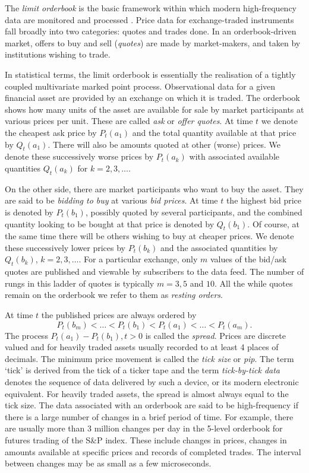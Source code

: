 The {\it limit orderbook} is the basic framework within which modern high-frequency data are monitored and processed \citep{harris2002trading,dacorogna2001introduction,hasbrouck2007empirical}.  Price data for exchange-traded instruments fall broadly 
into two categories:  quotes and trades done. In an orderbook-driven market, offers to buy and sell (\emph{quotes}) are made by market-makers, and taken by institutions wishing to trade.

In statistical terms, the limit orderbook is essentially the realisation of a tightly coupled multivariate marked point process. Observational data for a given financial asset are provided by an exchange on which it is traded. The orderbook shows how many units of the asset are available for sale by market participants at various prices per unit. These are called \emph{ask} or \emph{offer quotes}. At time $t$ we denote the cheapest ask price by $P_t(a_1)$ and the total quantity available at that price by $Q_t(a_1)$.  There will also be amounts quoted at other (worse) prices. We denote these successively worse prices by $P_t(a_k)$ with associated available quantities $Q_t(a_k)$ for $k=2,3,\dots$. 

On the other side, there are market participants who want to buy the asset. They are said to be \emph{bidding to buy} at various \emph{bid prices}. At time $t$ the highest bid price is denoted by $P_t(b_1)$, possibly quoted by several participants, and the combined quantity looking to be bought at that price is denoted by $Q_t(b_1)$. Of course, at the same time there will be others wishing to buy at cheaper prices. We denote these successively lower prices by $P_t(b_k)$ and the associated quantities by $Q_t(b_k)$, $k=2,3,\dots$.  For a particular  exchange, only $m$ values of the bid/ask quotes are published and viewable by subscribers to the data feed. The number of rungs in this ladder of quotes is typically $m=3,5$ and $10$. All the while quotes remain on the orderbook we refer to them as \emph{resting orders}. 

At time $t$ the published prices are always ordered by 
\begin{equation}\label{eq:levels}
 P_t(b_m) < \dots < P_t(b_1) < P_t(a_1)< \dots <P_t(a_m).
\end{equation}
The process $P_t(a_1) - P_t(b_1), t >0$ is called the \emph{spread}. Prices are discrete valued and for heavily traded assets usually recorded to at least 4 places of decimals. The minimum price movement is called the \emph{tick size} or \emph{pip}. The term `tick' is derived from the tick of a ticker tape and the term \emph{tick-by-tick data} denotes the sequence of data delivered  by such a device, or its modern electronic equivalent. For heavily traded assets, the spread is almost always equal to the tick size. The data associated with an orderbook are said to be high-frequency if there is a large number of changes in a brief period of time. For example, there are usually more than  3 million changes per day in the 5-level orderbook for futures trading of the S\&P index. These include changes in prices, changes in amounts available at specific prices and records of completed trades. The interval between changes may be as small as a few microseconds.

